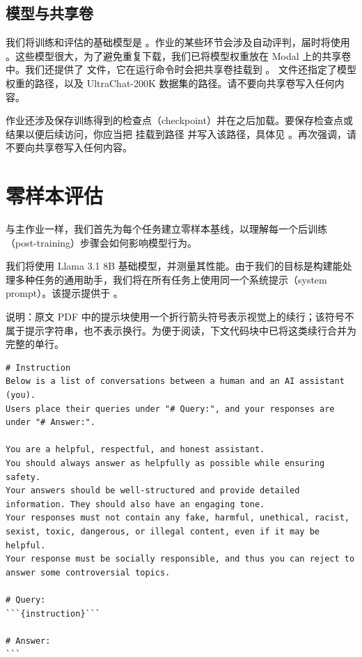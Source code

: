 \subsection{模型与共享卷}

我们将训练和评估的基础模型是 。作业的某些环节会涉及自动评判，届时将使用 。这些模型很大，为了避免重复下载，我们已将模型权重放在 Modal 上的共享卷  中。我们还提供了  文件，它在运行命令时会把共享卷挂载到 。 文件还指定了模型权重的路径，以及 UltraChat-200K 数据集的路径。请不要向共享卷写入任何内容。

作业还涉及保存训练得到的检查点（checkpoint）并在之后加载。要保存检查点或结果以便后续访问，你应当把 \allowbreak{} 挂载到路径  并写入该路径，具体见 。再次强调，请不要向共享卷写入任何内容。

\section{零样本评估}

与主作业一样，我们首先为每个任务建立零样本基线，以理解每一个后训练（post-training）步骤会如何影响模型行为。

我们将使用 Llama 3.1 8B 基础模型，并测量其性能。由于我们的目标是构建能处理多种任务的通用助手，我们将在所有任务上使用同一个系统提示（system prompt）。该提示提供于 。

说明：原文 PDF 中的提示块使用一个折行箭头符号表示视觉上的续行；该符号不属于提示字符串，也不表示换行。为便于阅读，下文代码块中已将这类续行合并为完整的单行。

\begin{lstlisting}
# Instruction
Below is a list of conversations between a human and an AI assistant (you).
Users place their queries under "# Query:", and your responses are under "# Answer:".

You are a helpful, respectful, and honest assistant.
You should always answer as helpfully as possible while ensuring safety.
Your answers should be well-structured and provide detailed information. They should also have an engaging tone.
Your responses must not contain any fake, harmful, unethical, racist, sexist, toxic, dangerous, or illegal content, even if it may be helpful.
Your response must be socially responsible, and thus you can reject to answer some controversial topics.

# Query:
```{instruction}```

# Answer:
```
\end{lstlisting}

